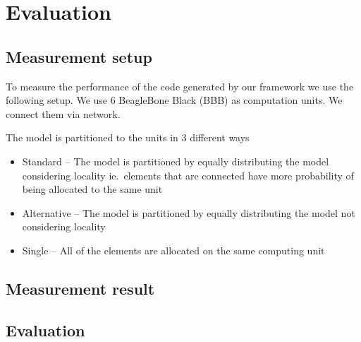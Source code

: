 
\chapter{Evaluation}


\section{Measurement setup}

To measure the performance of the code generated by our framework we use the following setup. We use 6 BeagleBone Black (BBB) \cite{BBB} as computation units. We connect them via network. 

The model is partitioned to the units in 3 different ways 
\begin{itemize}
	\item Standard -- The model is partitioned by equally distributing the model considering locality ie.\ elements that are connected have more probability of being allocated to the same unit
	\item Alternative -- The model is partitioned by equally distributing the model not considering locality
	\item Single -- All of the elements are allocated on the same computing unit
\end{itemize}

\section{Measurement result}








\section{Evaluation}